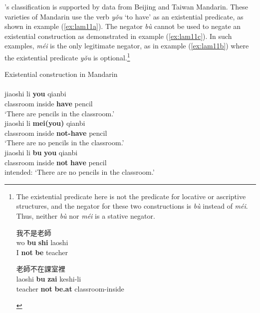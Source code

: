 \documentclass[output=paper,colorlinks,citecolor=brown,chinesefont]{langscibook}
\begin{document}
\citeauthor{Croft1991}'s classification is supported by data from Beijing and Taiwan Mandarin. These varieties of Mandarin use the verb \textit{yǒu} `to have' as an existential predicate, as shown in example (\ref{ex:lam11a}). The negator \textit{bù} cannot be used to negate an existential construction as demonstrated in example (\ref{ex:lam11c}).
In such examples, \textit{méi} is the only legitimate negator, as in example (\ref{ex:lam11b}) where the existential predicate \textit{yǒu} is optional.\footnote{The existential predicate here is not the predicate for locative or ascriptive structures, and the negator for these two constructions is \textit{bù} instead of \textit{méi}. Thus, neither \textit{bù} nor \textit{méi} is a stative negator.

\begin{multicols}{2}
\begin{exe}
	 {\cn 我不是老師} \label{ex:lami}\\
	\gll wo	\textbf{bu}	\textbf{shi} laoshi\\
	I \textbf{not} \textbf{be} teacher\\
\end{exe}

\begin{exe}
	 {\cn 老師不在課室裡} \label{ex:lamii}\\
	\gll laoshi	\textbf{bu}	\textbf{zai} keshi-li\\
	teacher	\textbf{not} \textbf{be.at} classroom-inside\\
\end{exe}
\end{multicols}}


\ea Existential construction in Mandarin \label{ex:lam11}\\
   \label{ex:lam11a}\\
  	\gll jiaoshi	 li	\textbf{you} qianbi\\ 
  	classroom	inside	\textbf{have}	pencil\\
  	\glt `There are pencils in the classroom.'
   \label{ex:lam11b}\\
  	\gll jiaoshi	 li \textbf{mei(you)} qianbi\\
  	classroom inside \textbf{not-have} pencil\\
  	\glt `There are no pencils in the classroom.'
   \label{ex:lam11c}\\
  	\gll *jiaoshi li \textbf{bu} \textbf{you} qianbi\\		
  	classroom	inside	\textbf{not} \textbf{have}	pencil\\
  	\glt intended: `There are no pencils in the classroom.'
\z \z 
\end{document}

